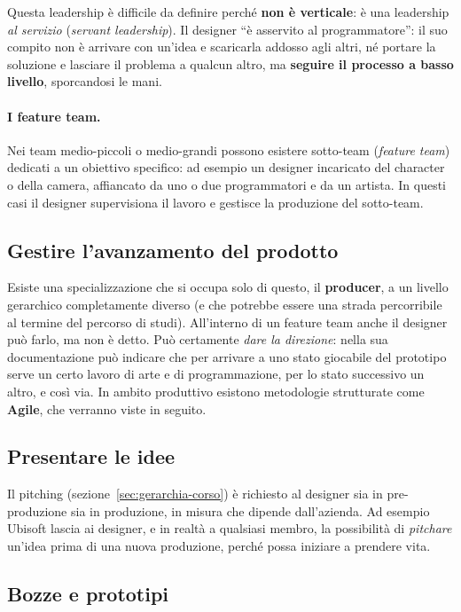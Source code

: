 Questa leadership è difficile da definire perché \textbf{non è verticale}: è
una leadership \emph{al servizio} (\emph{servant leadership}). Il designer
``è asservito al programmatore'': il suo compito non è arrivare con un'idea e
scaricarla addosso agli altri, né portare la soluzione e lasciare il problema
a qualcun altro, ma \textbf{seguire il processo a basso livello}, sporcandosi
le mani.

\paragraph{I feature team.} Nei team medio-piccoli o medio-grandi possono
esistere sotto-team (\emph{feature team}) dedicati a un obiettivo specifico:
ad esempio un designer incaricato del character o della camera, affiancato da
uno o due programmatori e da un artista. In questi casi il designer
supervisiona il lavoro e gestisce la produzione del sotto-team.

\subsection{Gestire l'avanzamento del prodotto}

Esiste una specializzazione che si occupa solo di questo, il
\textbf{producer}, a un livello gerarchico completamente diverso (e che
potrebbe essere una strada percorribile al termine del percorso di studi).
All'interno di un feature team anche il designer può farlo, ma non è detto.
Può certamente \emph{dare la direzione}: nella sua documentazione può
indicare che per arrivare a uno stato giocabile del prototipo serve un certo
lavoro di arte e di programmazione, per lo stato successivo un altro, e così
via. In ambito produttivo esistono metodologie strutturate come
\textbf{Agile}, che verranno viste in seguito.

\subsection{Presentare le idee}

Il pitching (sezione~\ref{sec:gerarchia-corso}) è richiesto al designer sia
in pre-produzione sia in produzione, in misura che dipende dall'azienda. Ad
esempio Ubisoft lascia ai designer, e in realtà a qualsiasi membro, la
possibilità di \emph{pitchare} un'idea prima di una nuova produzione, perché
possa iniziare a prendere vita.

\subsection{Bozze e prototipi}

